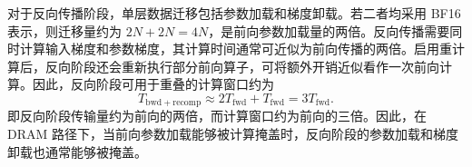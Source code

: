 \documentclass[bachelor,openany,oneside,color,AutoFakeBold=true]{buaathesis}
\begin{document}


对于反向传播阶段，单层数据迁移包括参数加载和梯度卸载。若二者均采用 BF16 表示，则迁移量约为 $2N+2N=4N$，是前向参数加载量的两倍。反向传播需要同时计算输入梯度和参数梯度，其计算时间通常可近似为前向传播的两倍。启用重计算后，反向阶段还会重新执行部分前向算子，可将额外开销近似看作一次前向计算。因此，反向阶段可用于重叠的计算窗口约为
\[
T_{\mathrm{bwd+recomp}}
\approx 2T_{\mathrm{fwd}} + T_{\mathrm{fwd}}
= 3T_{\mathrm{fwd}} .
\]
即反向阶段传输量约为前向的两倍，而计算窗口约为前向的三倍。因此，在 DRAM 路径下，当前向参数加载能够被计算掩盖时，反向阶段的参数加载和梯度卸载也通常能够被掩盖。
\end{document}
